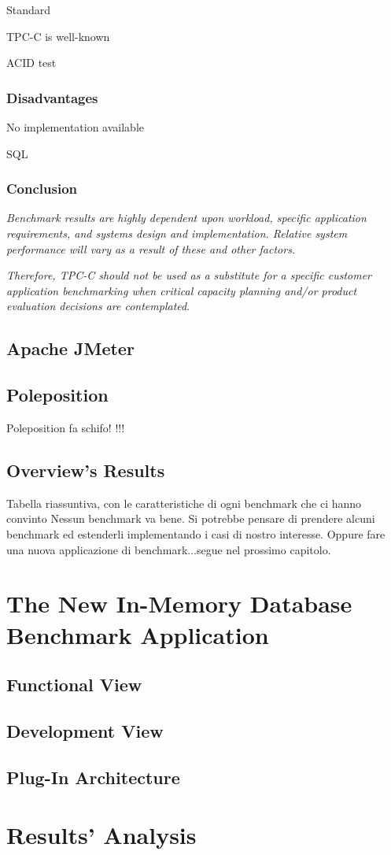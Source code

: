 Standard

TPC-C is well-known

ACID test


		\subsection{Disadvantages}

No implementation available

SQL


		\subsection{Conclusion}





\emph{Benchmark results are highly dependent upon workload, specific application requirements, and systems design and implementation. Relative system performance will vary as a result of these and other factors.} 

\emph{Therefore, TPC-C should not be used as a substitute for a specific customer application benchmarking when critical capacity planning and/or product evaluation decisions are contemplated}\cite{TPC-C}.
	
	\section{Apache JMeter}
	
	\section{Poleposition} \label{poleposition}
	Poleposition fa schifo! \cite{poleposition}!!!
	
	\section{Overview's Results}
Tabella riassuntiva, con le caratteristiche di ogni benchmark che ci hanno convinto
Nessun benchmark va bene.
Si potrebbe pensare di prendere alcuni benchmark ed estenderli implementando i casi di nostro interesse.
Oppure fare una nuova applicazione di benchmark...segue nel prossimo capitolo.
	
	
	
	
\chapter{The New In-Memory Database Benchmark Application}
	\section{Functional View}
	\section{Development View}
	\section{Plug-In Architecture}

\chapter{Results' Analysis}
